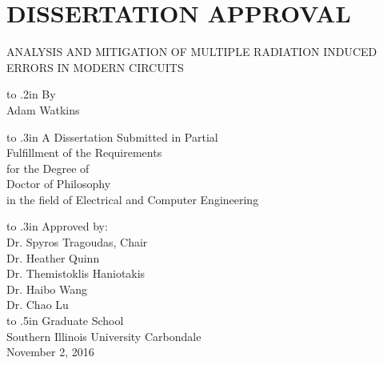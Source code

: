 

\chapter*{DISSERTATION APPROVAL} 


\thispagestyle{empty}

\begin{center}
\medskip
ANALYSIS AND MITIGATION OF MULTIPLE RADIATION INDUCED ERRORS IN MODERN CIRCUITS

\vbox to .2in{}
By \\
Adam Watkins

\vbox to .3in{}
A Dissertation Submitted in Partial \\
Fulfillment of the Requirements \\
for the Degree of \\
Doctor of Philosophy \\
in the field of Electrical and Computer Engineering

\vbox to .3in{}
Approved by: \\
Dr. Spyros Tragoudas, Chair \\
Dr. Heather Quinn \\
Dr. Themistoklis Haniotakis \\
Dr. Haibo Wang \\
Dr. Chao Lu \\

\baselineskip=14pt
\vbox to .5in{}
Graduate School \\
Southern Illinois University Carbondale \\
November 2, 2016
\end{center}

\baselineskip=24pt
\newpage

